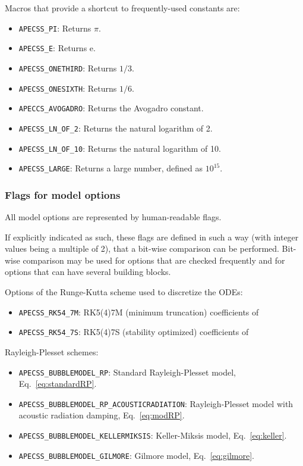Macros that provide a shortcut to frequently-used constants are:\vspace{-1em}
\begin{itemize}[noitemsep]
  \item {\tt APECSS\_PI}: Returns $\pi$.
  \item {\tt APECSS\_E}: Returns $\mathrm{e}$.
  \item {\tt APECSS\_ONETHIRD}: Returns $1/3$.
  \item {\tt APECSS\_ONESIXTH}: Returns $1/6$.
  \item {\tt APECCS\_AVOGADRO}: Returns the Avogadro constant.
  \item {\tt APECSS\_LN\_OF\_2}: Returns the natural logarithm of 2.
  \item {\tt APECSS\_LN\_OF\_10}: Returns the natural logarithm of 10.
  \item {\tt APECSS\_LARGE}: Returns a large number, defined as $10^{15}$.
\end{itemize}

\subsubsection{Flags for model options}

All model options are represented by human-readable flags. 

If explicitly indicated as such, these flags are defined in such a way (with integer values being a multiple of 2), that a bit-wise comparison can be performed. Bit-wise comparison may be used for options that are checked frequently and for options that can have several building blocks.

Options of the Runge-Kutta scheme used to discretize the ODEs:\vspace{-1em}
\begin{itemize}[noitemsep]
  \item {\tt APECSS\_RK54\_7M}: RK5(4)7M (minimum truncation) coefficients of \citet{Dormand1980}
  \item {\tt APECSS\_RK54\_7S}: RK5(4)7S (stability optimized) coefficients of \citet{Dormand1980}
\end{itemize}

Rayleigh-Plesset schemes:\vspace{-1em}
\begin{itemize}[noitemsep]
  \item {\tt APECSS\_BUBBLEMODEL\_RP}: Standard Rayleigh-Plesset model, Eq.~\eqref{eq:standardRP}.
  \item {\tt APECSS\_BUBBLEMODEL\_RP\_ACOUSTICRADIATION}: Rayleigh-Plesset model with acoustic radiation damping, Eq.~\eqref{eq:modRP}.
  \item {\tt APECSS\_BUBBLEMODEL\_KELLERMIKSIS}: Keller-Miksis model, Eq.~\eqref{eq:keller}.
  \item {\tt APECSS\_BUBBLEMODEL\_GILMORE}: Gilmore model, Eq.~\eqref{eq:gilmore}.
\end{itemize}

